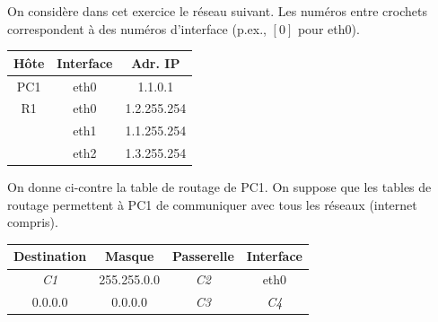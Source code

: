 
On considère dans cet exercice le réseau suivant. Les numéros entre
crochets correspondent à des numéros d'interface (p.ex., $[0]$ pour
eth0).\\
\begin{center}
  \begin{minipage}{.67\textwidth}
    \scalebox{0.92}{}
  \end{minipage}
  \begin{minipage}{.31\textwidth}
    \begin{center}
      \begin{tabular}{|c|c|c|}
        \hline
        Hôte & Interface & Adr. IP\\
        \hline
        \hline
        PC1 & eth0 & 1.1.0.1\\
        \hline
        R1 & eth0 & 1.2.255.254\\
        & eth1 & 1.1.255.254\\
        & eth2 & 1.3.255.254\\
        \hline
      \end{tabular}
    \end{center}
  \end{minipage}
\end{center}

\noindent%
  \begin{minipage}{.49\textwidth}
On donne ci-contre la table de routage de PC1. On
suppose que les tables de routage permettent à PC1 de communiquer avec
tous les réseaux (internet compris).
  \end{minipage}
  \begin{minipage}{.02\textwidth}\end{minipage}
  \begin{minipage}{.46\textwidth}

  \begin{tabular}{|c|c|c|c|}
    \hline
    Destination & Masque & Passerelle & Interface\\
    \hline
    \hline
    {\em C1} & 255.255.0.0 & {\em C2} & eth0\\
    0.0.0.0 & 0.0.0.0 & {\em C3} & {\em C4}\\
    \hline
  \end{tabular}
  \end{minipage}
\\
